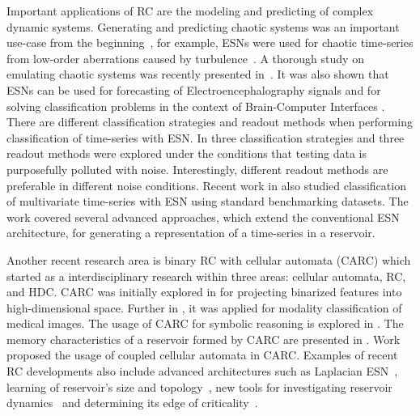 Important applications of RC are the modeling and predicting of complex dynamic systems. 
Generating and predicting chaotic systems was an important use-case from the beginning~\cite{Jaeger2001}, for example, ESNs were used for chaotic time-series from low-order aberrations caused by turbulence~\cite{Weddell2008}.
A thorough study on emulating chaotic systems was recently presented in~\cite{Antonik2017}.
It was also shown that ESNs can be used for forecasting of Electroencephalography signals and for solving classification problems in the context of Brain-Computer Interfaces \cite{ESNEEG}.
There are different classification strategies and readout methods when performing classification of time-series with ESN. 
In \cite{ComparisonReadOut} three classification strategies and three readout methods were explored under the conditions that testing data is purposefully polluted with noise. 
Interestingly, different readout methods are preferable in different noise conditions. 
Recent work in \cite{Bianchi2018} also studied classification of multivariate time-series with ESN using standard benchmarking datasets. 
The work covered several advanced approaches, which extend the conventional ESN architecture, for generating a representation of a time-series in a reservoir. 

Another recent research area is binary RC with cellular automata (CARC) which started as a interdisciplinary research within three areas: cellular automata, RC, and HDC. CARC was initially explored in \cite{Yilmaz15a}  for projecting binarized features into high-dimensional space.  Further in \cite{ISBI}, it was applied for modality classification of medical images. The usage of CARC for symbolic reasoning is explored in \cite{Yilmaz15b}. The memory characteristics of a reservoir formed by CARC are presented in  \cite{CAHD17}. Work \cite{RCELMCA17} proposed the usage of coupled cellular automata in CARC.    
Examples of recent RC developments also include advanced architectures such as Laplacian ESN~\cite{Han2018}, learning of reservoir's size and topology~\cite{Qiao2017}, new tools for investigating reservoir dynamics~\cite{BianchiTNNLS18} and determining its edge of criticality~\cite{Livi2018}.


